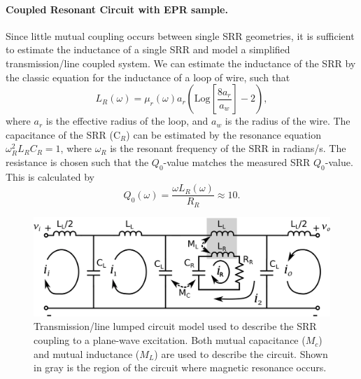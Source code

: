 \noindent \paragraph*{Coupled Resonant Circuit with EPR sample.} Since little mutual coupling occurs between single SRR geometries, it is sufficient to estimate the inductance of a single SRR and model a simplified transmission\-/line coupled system. We can estimate the inductance of the SRR by the classic equation for the inductance of a loop of wire, such that 
\begin{equation}
    L_R(\omega) = \mu_r(\omega) a_r \left(\text{Log}\left[ \frac{8 a_r}{a_w} \right] -2\right),
\end{equation}
where $a_r$ is the effective radius of the loop, and $a_w$ is the radius of the wire. The capacitance of the SRR (C$_R$) can be estimated by the resonance equation $\omega_R^2 L_RC_R=1$, where $\omega_R$ is the resonant frequency of the SRR in radians/s. The resistance is chosen such that the $Q_0$-value matches the measured SRR $Q_0$-value. This is calculated by
\begin{equation}
    Q_0(\omega) = \frac{\omega L_R(\omega)}{R_R} \approx 10.
\end{equation}

\begin{figure}[htp]
\centering
   \includegraphics[width=\textwidth]{Kapitel/Ch3-Images/03-CircuitFig.eps}%
  \caption[Transmission\-/line lumped circuit model.]{Transmission\-/line lumped circuit model used to describe the SRR coupling to a plane-wave excitation. Both mutual capacitance ($M_c$) and mutual inductance ($M_L$) are used to describe the circuit. Shown in gray is the region of the circuit where magnetic resonance occurs.}
  \label{ch3-fig:circuit}
\end{figure}


